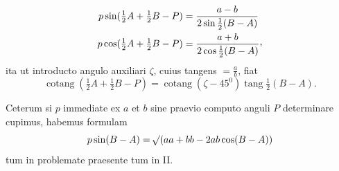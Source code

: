\[
\begin{aligned}
p\sin(\tfrac{1}{2}A+\tfrac{1}{2}B-P)&=\frac{a-b}{2\sin\tfrac{1}{2}(B-A)}\\
p\cos(\tfrac{1}{2}A+\tfrac{1}{2}B-P)&=\frac{a+b}{2\cos\tfrac{1}{2}(B-A)}\mathpunct{\raisebox{.45ex}{,}}
\end{aligned}
\]
ita ut introducto angulo auxiliari $\zeta$, cuius tangens $=\frac{a}{b}$, fiat
\[
\operatorname{cotang}(\tfrac{1}{2}A+\tfrac{1}{2}B-P)=\operatorname{cotang}(\zeta-45^0)\operatorname{tang}\tfrac{1}{2}(B-A).
\]
\par
Ceterum si $p$ immediate ex $a$ et $b$ sine praevio computo anguli $P$ determinare cupimus, habemus formulam
\[
p\sin(B-A)=\mathord{{}^{}\!\surd}(aa+bb-2ab\cos(B-A))
\]
tum in problemate praesente tum in II.
